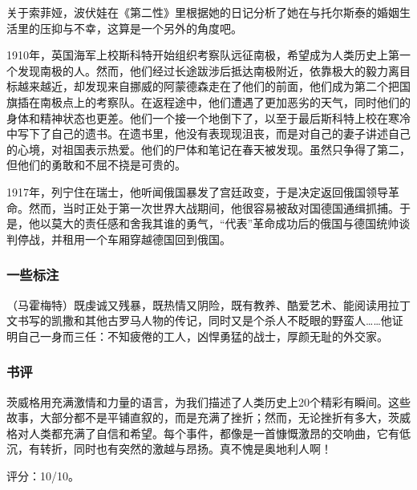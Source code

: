 \begin{itemize*}
关于索菲娅，波伏娃在《第二性》里根据她的日记分析了她在与托尔斯泰的婚姻生活里的压抑与不幸，这算是一个另外的角度吧。
	\item 1910年，英国海军上校斯科特开始组织考察队远征南极，希望成为人类历史上第一个发现南极的人。然而，他们经过长途跋涉后抵达南极附近，依靠极大的毅力离目标越来越近，却发现来自挪威的阿蒙德森走在了他们的前面，他们成为第二个把国旗插在南极点上的考察队。在返程途中，他们遭遇了更加恶劣的天气，同时他们的身体和精神状态也更差。他们一个接一个地倒下了，以至于最后斯科特上校在寒冷中写下了自己的遗书。在遗书里，他没有表现现沮丧，而是对自己的妻子讲述自己的心境，对祖国表示热爱。他们的尸体和笔记在春天被发现。虽然只争得了第二，但他们的勇敢和不屈不挠是可贵的。
	\item 1917年，列宁住在瑞士，他听闻俄国暴发了宫廷政变，于是决定返回俄国领导革命。然而，当时正处于第一次世界大战期间，他很容易被敌对国德国通缉抓捕。于是，他以莫大的责任感和舍我其谁的勇气，“代表”革命成功后的俄国与德国统帅谈判停战，并租用一个车厢穿越德国回到俄国。	
\end{itemize*}

\subsubsection{一些标注}

（马霍梅特）既虔诚又残暴，既热情又阴险，既有教养、酷爱艺术、能阅读用拉丁文书写的凯撒和其他古罗马人物的传记，同时又是个杀人不眨眼的野蛮人……他证明自己一身而三任：不知疲倦的工人，凶悍勇猛的战士，厚颜无耻的外交家。

\subsubsection{书评}
茨威格用充满激情和力量的语言，为我们描述了人类历史上20个精彩有瞬间。这些故事，大部分都不是平铺直叙的，而是充满了挫折；然而，无论挫折有多大，茨威格对人类都充满了自信和希望。每个事件，都像是一首慷慨激昂的交响曲，它有低沉，有转折，同时也有突然的激越与昂扬。真不愧是奥地利人啊！

评分：10/10。